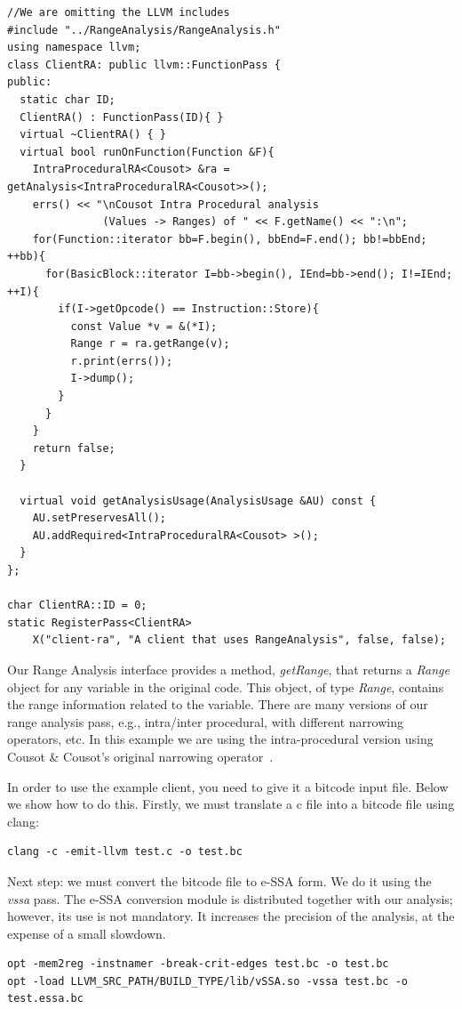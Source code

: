 \documentclass{paper}
\begin{document}
\begin{lstlisting}[frame=single]
//We are omitting the LLVM includes
#include "../RangeAnalysis/RangeAnalysis.h"
using namespace llvm;
class ClientRA: public llvm::FunctionPass {
public:
  static char ID;
  ClientRA() : FunctionPass(ID){ }
  virtual ~ClientRA() { }
  virtual bool runOnFunction(Function &F){
    IntraProceduralRA<Cousot> &ra = getAnalysis<IntraProceduralRA<Cousot>>();
    errs() << "\nCousot Intra Procedural analysis 
               (Values -> Ranges) of " << F.getName() << ":\n";
    for(Function::iterator bb=F.begin(), bbEnd=F.end(); bb!=bbEnd; ++bb){
      for(BasicBlock::iterator I=bb->begin(), IEnd=bb->end(); I!=IEnd; ++I){
        if(I->getOpcode() == Instruction::Store){
          const Value *v = &(*I);
          Range r = ra.getRange(v);
          r.print(errs());
          I->dump();
        }
      }
    }
    return false;
  }

  virtual void getAnalysisUsage(AnalysisUsage &AU) const {
    AU.setPreservesAll();
    AU.addRequired<IntraProceduralRA<Cousot> >();
  }
};

char ClientRA::ID = 0;
static RegisterPass<ClientRA> 
	X("client-ra", "A client that uses RangeAnalysis", false, false);
\end{lstlisting}

Our Range Analysis interface provides a method, \textit{getRange}, that returns
a \textit{Range} object for any variable in the original code.
This object, of type \textit{Range}, contains the range information related to
the variable.
There are many versions of our range analysis pass, e.g., intra/inter procedural,
with different narrowing operators, etc.
In this example we are using the intra-procedural version using
Cousot \& Cousot's original narrowing operator~\cite{Cousot77}.

In order to use the example client, you need to give it a bitcode input file. Below we show how to do this.
Firstly, we must translate a c file into a bitcode file using clang:
\begin{lstlisting}[frame=single]
clang -c -emit-llvm test.c -o test.bc
\end{lstlisting}

Next step: we must convert the bitcode file to e-SSA form.
We do it using the \textit{vssa} pass.
The e-SSA conversion module is distributed together with our analysis; however,
its use is not mandatory.
It increases the precision of the analysis, at the expense of a small slowdown.
\begin{lstlisting}[frame=single]
opt -mem2reg -instnamer -break-crit-edges test.bc -o test.bc
opt -load LLVM_SRC_PATH/BUILD_TYPE/lib/vSSA.so -vssa test.bc -o test.essa.bc
\end{lstlisting}
\end{document}
